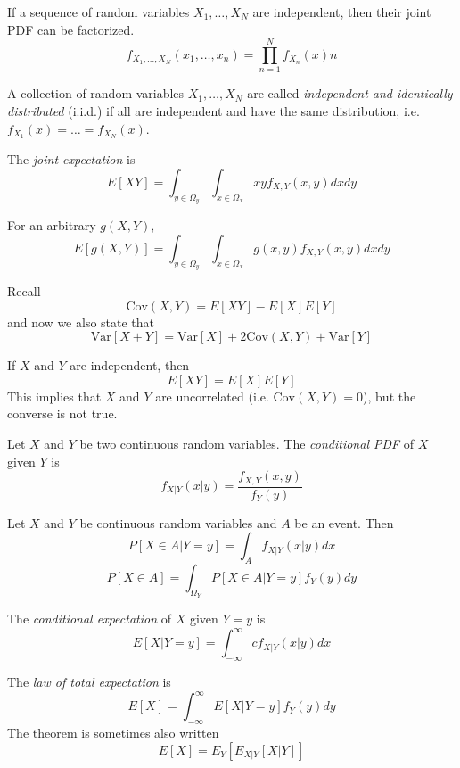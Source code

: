 If a sequence of random variables
$X_1, \dots, X_N$ are independent,
then their joint PDF can be factorized.
\begin{equation}
    f_{X_1,\dots,X_N}(x_1,\dots,x_n) = \prod_{n=1}^{N}f_{X_n}(x)n
\end{equation}

A collection of random variables $X_1, \dots, X_N$ are called
\emph{independent and identically distributed} (i.i.d.) if
all are independent and have the same distribution, i.e.
$f_{X_1}(x) = \dots = f_{X_N}(x)$.

The \emph{joint expectation} is
\begin{equation}
    E[XY] = \int_{y\in \Omega_y}\int_{x\in \Omega_x} xy f_{X,Y}(x,y)dxdy
\end{equation}

For an arbitrary $g(X,Y)$,
\begin{equation}
    E[g(X,Y)] = \int_{y\in \Omega_y}\int_{x\in \Omega_x} g(x,y) f_{X,Y}(x,y)dxdy
\end{equation}

Recall
\begin{equation}
    \text{Cov}(X,Y) = E[XY] - E[X]E[Y]
\end{equation}
and now we also state that
\begin{equation}
    \text{Var}[X+Y] = \text{Var}[X] + 2\text{Cov}(X,Y) + \text{Var}[Y]
\end{equation}

If $X$ and $Y$ are independent, then
\begin{equation}
    E[XY] = E[X]E[Y]
\end{equation}
This implies that $X$ and $Y$ are
uncorrelated (i.e. $\text{Cov}(X,Y) = 0$),
but the converse is not true.

Let $X$ and $Y$ be two continuous random variables.
The \emph{conditional PDF} of $X$ given $Y$ is
\begin{equation}
    f_{X|Y}(x|y) = \frac{f_{X,Y}(x,y)}{f_Y(y)}
\end{equation}

Let $X$ and $Y$ be continuous random variables and
$A$ be an event. Then
\begin{equation}
    P[X \in A | Y=y] = \int_{A} f_{X|Y}(x|y)dx
\end{equation}
\begin{equation}
    P[X\in A] = \int_{\Omega_Y} P[X\in A|Y = y]f_Y(y)dy
\end{equation}

The \emph{conditional expectation} of $X$ given $Y=y$ is
\begin{equation}
    E[X|Y=y] = \int_{-\infty}^{\infty}cf_{X|Y}(x|y)dx
\end{equation}

The \emph{law of total expectation} is
\begin{equation}
    E[X] = \int_{-\infty}^{\infty} E[X|Y=y]f_Y(y)dy
\end{equation}
The theorem is sometimes also written
\begin{equation}
    E[X] = E_Y[E_{X|Y}[X|Y]]
\end{equation}